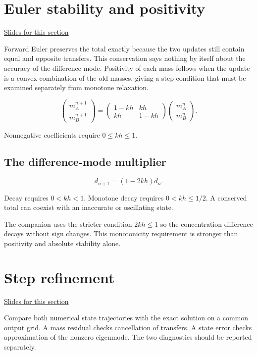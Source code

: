 \documentclass[11pt,letterpaper]{article}
\theoremstyle{definition}\newtheorem{definition}{Definition}\newtheorem{example}{Example}
\numberwithin{equation}{section}
\begin{document}
\section{Euler stability and positivity}
\hypertarget{note-euler-stability-and-positivity}{}\label{note:euler-stability-and-positivity}
{\small \href{slides.html\#frame=euler-stability-and-positivity\&step=1}{Slides for this section}}\par
Forward Euler preserves the total exactly because the two updates still contain equal and opposite transfers. This conservation says nothing by itself about the accuracy of the difference mode. Positivity of each mass follows when the update is a convex combination of the old masses, giving a step condition that must be examined separately from monotone relaxation.

\[
\begin{pmatrix}m_A^{n+1}\\m_B^{n+1}\end{pmatrix}
=\begin{pmatrix}1-kh&kh\\kh&1-kh\end{pmatrix}
\begin{pmatrix}m_A^n\\m_B^n\end{pmatrix}.
\]

Nonnegative coefficients require $0\leq kh\leq1$.

\subsection*{The difference-mode multiplier}
\[
d_{n+1}=(1-2kh)d_n.
\]

Decay requires $0<kh<1$. Monotone decay requires $0<kh\leq1/2$. A conserved total can coexist with an inaccurate or oscillating state.

The companion uses the stricter condition $2kh\le1$ so the concentration difference decays without sign changes. This monotonicity requirement is stronger than positivity and absolute stability alone.
\section{Step refinement}
\hypertarget{note-step-refinement}{}\label{note:step-refinement}
{\small \href{slides.html\#frame=step-refinement\&step=1}{Slides for this section}}\par
Compare both numerical state trajectories with the exact solution on a common output grid. A mass residual checks cancellation of transfers. A state error checks approximation of the nonzero eigenmode. The two diagnostics should be reported separately.
\end{document}
